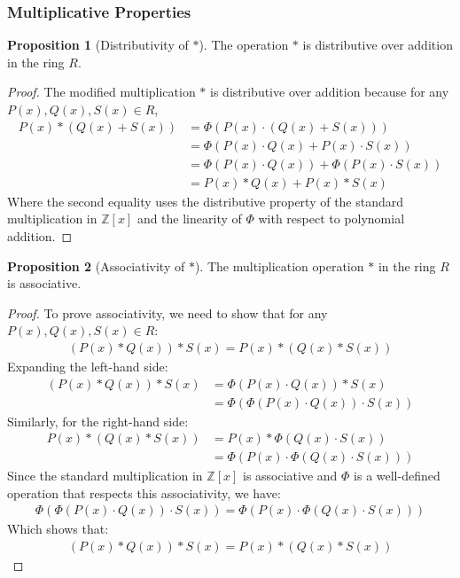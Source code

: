 \documentclass{article}
\theoremstyle{plain}
\theoremstyle{definition}
\newtheorem{proposition}{Proposition}
\begin{document}
\subsubsection{Multiplicative Properties}
\begin{proposition}[Distributivity of \(\ast\)] \label{proposition:ring:1}
The operation \(\ast\) is distributive over addition in the ring \(R\).
\end{proposition}
\begin{proof}
The modified multiplication \(\ast\) is distributive over addition because for any \( P(x), Q(x), S(x) \in R \),
\begin{align}
    P(x) \ast (Q(x) + S(x)) &= \Phi(P(x) \cdot (Q(x) + S(x))) \\
    &= \Phi(P(x) \cdot Q(x) + P(x) \cdot S(x)) \\
    &= \Phi(P(x) \cdot Q(x)) + \Phi(P(x) \cdot S(x)) \\
    &= P(x) \ast Q(x) + P(x) \ast S(x)
\end{align}
Where the second equality uses the distributive property of the standard multiplication in \( \mathbb{Z}[x] \) and the linearity of \(\Phi\) with respect to polynomial addition.
\end{proof}

\begin{proposition}[Associativity of \(\ast\)] \label{proposition:ring:2}
The multiplication operation \(\ast\) in the ring \(R\) is associative.
\end{proposition}
\begin{proof}
To prove associativity, we need to show that for any \( P(x), Q(x), S(x) \in R \):
\begin{align}
    (P(x) \ast Q(x)) \ast S(x) = P(x) \ast (Q(x) \ast S(x))
\end{align}
Expanding the left-hand side:
\begin{align}
    (P(x) \ast Q(x)) \ast S(x) &= \Phi(P(x) \cdot Q(x)) \ast S(x) \\
    &= \Phi(\Phi(P(x) \cdot Q(x)) \cdot S(x))
\end{align}
Similarly, for the right-hand side:
\begin{align}
    P(x) \ast (Q(x) \ast S(x)) &= P(x) \ast \Phi(Q(x) \cdot S(x)) \\
    &= \Phi(P(x) \cdot \Phi(Q(x) \cdot S(x)))
\end{align}
Since the standard multiplication in \(\mathbb{Z}[x]\) is associative and \(\Phi\) is a well-defined operation that respects this associativity, we have:
\begin{align}
    \Phi(\Phi(P(x) \cdot Q(x)) \cdot S(x)) = \Phi(P(x) \cdot \Phi(Q(x) \cdot S(x)))
\end{align}
Which shows that:
\begin{align}
    (P(x) \ast Q(x)) \ast S(x) = P(x) \ast (Q(x) \ast S(x))
\end{align}
\end{proof}
\end{document}
